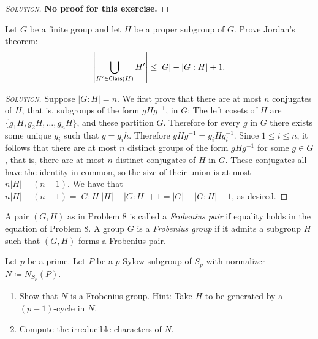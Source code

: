 \begin{proof}[{\scshape Solution}]
\textbf{No proof for this exercise.}
\end{proof}

\newpage

\begin{problem}
Let $G$ be a finite group and let $H$ be a proper subgroup of $G$. Prove Jordan's theorem:
\[
  \left\lvert \bigcup_{H' \in \mathsf{Class}(H)} H' \right\rvert \leq \lvert G \rvert - \lvert G:H\rvert +1.
\]
\end{problem}


\begin{proof}[{\scshape Solution}]
Suppose $\lvert G : H \rvert = n$. We first prove that there are at most $n$ conjugates of $H$, that is, subgroups of the form $gHg^{-1}$, in $G$: The left cosets of $H$ are $\{g_1H, g_2H, \ldots, g_nH\}$, and these partition $G$. Therefore for every $g$ in $G$ there exists some unique $g_i$ such that $g = g_ih$. Therefore $gHg^{-1} = g_iHg_i^{-1}$. Since $1 \leq i \leq n$, it follows that there are at most $n$ distinct groups of the form $gHg^{-1}$ for some $g \in G$, that is, there are at most $n$ distinct conjugates of $H$ in $G$. These conjugates all have the identity in common, so the size of their union is at most $n\lvert H \rvert - (n-1)$. We have that $n\lvert H \rvert -(n-1) = \lvert G :H \rvert \lvert H\rvert - \lvert G :H \rvert + 1 = \lvert G \rvert - \lvert G :H \rvert + 1$, as desired.
\end{proof}

\newpage
  \noindent A pair $(G, H)$ as in Problem 8 is called a \emph{Frobenius pair} if equality holds in the equation of Problem 8. A group $G$ is a \emph{Frobenius group} if it admits a subgroup $H$ such that $(G, H)$ forms a Frobenius pair.

\begin{problem}
  Let $p$ be a prime. Let $P$ be a $p$-Sylow subgroup of $S_p$ with normalizer $N\coloneqq N_{S_p}(P)$.
  \begin{enumerate}[font=\normalfont,label=\textbf{(\Alph*)}]


    \item Show that $N$ is a Frobenius group. Hint: Take $H$ to be generated by a $(p-1)$-cycle in $N$.
    \item Compute the irreducible characters of $N$.

  \end{enumerate}
\end{problem}

